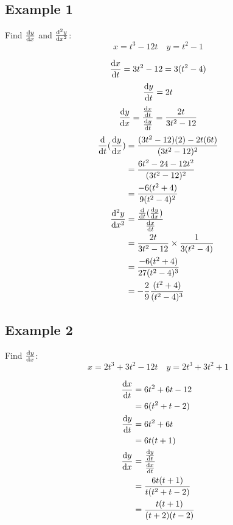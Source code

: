 \documentclass[letterpaper, 12pt]{math}
\begin{document}
\subsection*{Example 1}
Find \( \frac{\mathrm{d}{y}}{\mathrm{d}{x}} \) and \( \frac{\mathrm{d^2}{y}}{\mathrm{d}{x}^{2}} \):
\[ x = t^{3}-12t \quad y = t^{2}-1 \]
\begin{center}
\end{center}
\[ \frac{\mathrm{d}{x}}{\mathrm{d}{t}} = 3t^{2}-12 = 3(t^{2}-4) \]
\[ \frac{\mathrm{d}{y}}{\mathrm{d}{t}} = 2t \]
\[ \frac{\mathrm{d}{y}}{\mathrm{d}{x}} =
   \frac{\frac{\mathrm{d}{x}}{\mathrm{d}{t}}}{\frac{\mathrm{d}{y}}{\mathrm{d}{t}}} =
   \frac{2t}{3t^{2}-12} \]
\begin{align*}
  \frac{\mathrm{d}}{\mathrm{d}{t}}(\frac{\mathrm{d}{y}}{\mathrm{d}{x}}) &=
    \frac{(3t^{2}-12)(2)-2t(6t)}{(3t^{2}-12)^{2}} \\
  &= \frac{6t^{2}-24-12t^{2}}{(3t^{2}-12)^{2}} \\
  &= \frac{-6(t^{2}+4)}{9(t^{2}-4)^{2}} \\
  \frac{\mathrm{d^2}{y}}{\mathrm{d}{x}^{2}} &=
    \frac{\frac{\mathrm{d}}{\mathrm{d}{t}}(\frac{\mathrm{d}{y}}{\mathrm{d}{x}})}
      {\frac{\mathrm{d}{x}}{\mathrm{d}{t}}} \\
  &= \frac{2t}{3t^{2}-12}\times\frac{1}{3(t^{2}-4)} \\
  &= \frac{-6(t^{2}+4)}{27(t^{2}-4)^{3}} \\
  &= -\frac{2}{9}\frac{(t^{2}+4)}{(t^{2}-4)^{3}}
\end{align*}

\subsection*{Example 2}
Find \( \frac{\mathrm{d}{y}}{\mathrm{d}{x}} \):
\[ x = 2t^{3}+3t^{2}-12t \quad y = 2t^{3}+3t^{2}+1 \]
\begin{center}
\end{center}
\begin{align*}
  \frac{\mathrm{d}{x}}{\mathrm{d}{t}} &= 6t^{2}+6t-12 \\
  &= 6(t^{2}+t-2) \\
  \frac{\mathrm{d}{y}}{\mathrm{d}{t}} &= 6t^{2}+6t \\
  &= 6t(t+1) \\
  \frac{\mathrm{d}{y}}{\mathrm{d}{x}} &=
    \frac{\frac{\mathrm{d}{y}}{\mathrm{d}{t}}}{\frac{\mathrm{d}{x}}{\mathrm{d}{t}}} \\
  &= \frac{6t(t+1)}{t(t^{2}+t-2)} \\
  &= \frac{t(t+1)}{(t+2)(t-2)}
\end{align*}
\end{document}
